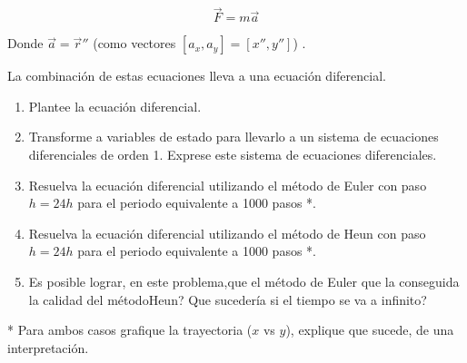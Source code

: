 \documentclass[a4paper,11pt]{article}
\theoremstyle{mytheor}
\begin{document}
\begin{equation*}
\vec F = m \vec a
\end{equation*}

Donde $\vec a =\vec r''$ (como vectores $[a_x,a_y]= [x'',y'']$) .


La combinación de estas ecuaciones lleva a una ecuación diferencial.
\begin{enumerate}
\item Plantee la ecuación diferencial. 
\item Transforme a variables de estado para llevarlo a un sistema de ecuaciones diferenciales de orden 1. Exprese este sistema de ecuaciones diferenciales.
\item Resuelva la ecuación diferencial utilizando el método de Euler con paso $h= 24h$ para el periodo equivalente a 1000 pasos *.
\item Resuelva la ecuación diferencial utilizando el método de Heun con paso $h= 24h$ para el periodo equivalente a 1000 pasos *.
\item Es posible lograr, en este problema,que el método de Euler que la conseguida la calidad del métodoHeun? Que sucedería si el tiempo se va a infinito?
\end{enumerate}

* Para ambos casos grafique la trayectoria ($x$ vs $y$), explique que sucede, de una interpretación.
\end{document}

